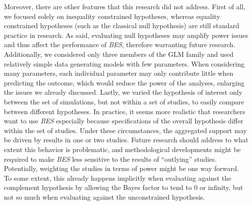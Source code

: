 \documentclass[
]{interact}
\begin{document}
                    Moreover, there are other features that this research did not address.
                    First of all, we focused solely on inequality constrained hypotheses,
                    whereas equality constrained hypotheses (such as the classical null
                                                             hypothesis) are still standard practice in research. As said, evaluating
                    null hypotheses may amplify power issues and thus affect the performance
                    of \emph{BES}, therefore warranting future research. Additionally, we
                    considered only three members of the GLM family and used relatively
                    simple data generating models with few parameters. When considering many
                    parameters, each individual parameter may only contribute little when
                    predicting the outcome, which would reduce the power of the analyses,
                    enlarging the issues we already discussed. Lastly, we varied the
                    hypothesis of interest only between the set of simulations, but not
                    within a set of studies, to easily compare between different hypotheses.
                    In practice, it seems more realistic that researchers want to use
                    \emph{BES} especially because specifications of the overall hypothesis
                    differ within the set of studies. Under these circumstances, the
                    aggregated support may be driven by results in one or two studies.
                    Future research should address to what extent this behavior is
                    problematic, and methodological developments might be required to make
                    \emph{BES} less sensitive to the results of ``outlying'' studies.
                    Potentially, weighting the studies in terms of power might be one way
                    forward. To some extent, this already happens implicitly when evaluating
                    against the complement hypothesis by allowing the Bayes factor to tend
                    to 0 or infinity, but not so much when evaluating against the
                    unconstrained hypothesis.
                    
\end{document}
